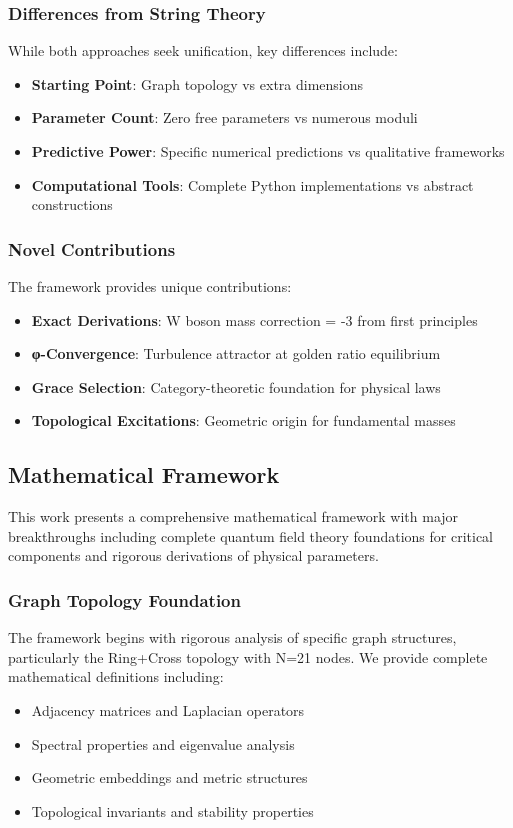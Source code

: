 \documentclass[12pt,a4paper]{article}
\begin{document}
\subsubsection{Differences from String Theory}
While both approaches seek unification, key differences include:

\begin{itemize}
\item \textbf{Starting Point}: Graph topology vs extra dimensions
\item \textbf{Parameter Count}: Zero free parameters vs numerous moduli
\item \textbf{Predictive Power}: Specific numerical predictions vs qualitative frameworks
\item \textbf{Computational Tools}: Complete Python implementations vs abstract constructions
\end{itemize}

\subsubsection{Novel Contributions}
The framework provides unique contributions:

\begin{itemize}
\item \textbf{Exact Derivations}: W boson mass correction = -3 from first principles
\item \textbf{φ-Convergence}: Turbulence attractor at golden ratio equilibrium
\item \textbf{Grace Selection}: Category-theoretic foundation for physical laws
\item \textbf{Topological Excitations}: Geometric origin for fundamental masses
\end{itemize}

\subsection{Mathematical Framework}

This work presents a comprehensive mathematical framework with major breakthroughs including complete quantum field theory foundations for critical components and rigorous derivations of physical parameters.

\subsubsection{Graph Topology Foundation}
The framework begins with rigorous analysis of specific graph structures, particularly the Ring+Cross topology with N=21 nodes. We provide complete mathematical definitions including:
\begin{itemize}
\item Adjacency matrices and Laplacian operators
\item Spectral properties and eigenvalue analysis
\item Geometric embeddings and metric structures
\item Topological invariants and stability properties
\end{itemize}
\end{document}
